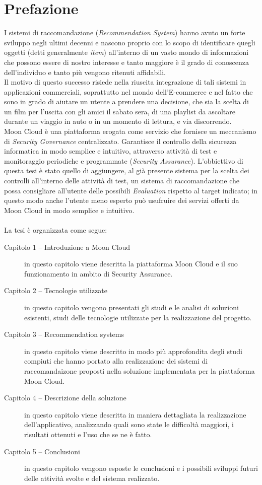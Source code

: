 \chapter{Prefazione}
\label{chp:00-prefaction}

I sistemi di raccomandazione (\textit{Recommendation System}) hanno avuto un forte sviluppo negli ultimi decenni e 
nascono proprio con lo scopo di identificare quegli oggetti (detti generalmente \textit{item}) all'interno di un vasto 
mondo di informazioni che possono essere di nostro interesse e tanto maggiore è il grado di conoscenza dell'individuo 
e tanto più vengono ritenuti affidabili.
\\
Il motivo di questo successo risiede nella riuscita integrazione di tali sistemi in applicazioni commerciali, 
soprattutto nel mondo dell’E-commerce e nel fatto che sono in grado di aiutare un utente a prendere una decisione, che sia la scelta di 
un film per l'uscita con gli amici il sabato sera, di una playlist da ascoltare durante un viaggio in auto o in un momento di lettura, 
e via discorrendo. 
\\
Moon Cloud è una piattaforma erogata come servizio che fornisce un meccanismo di \textit{Security Governance} centralizzato. 
Garantisce il controllo della sicurezza informatica in modo semplice e intuitivo, attraverso attività di test e monitoraggio 
periodiche e programmate (\textit{Security Assurance}). L'obbiettivo di questa tesi è stato quello di aggiungere, al già 
presente sistema per la scelta dei controlli all'interno delle attività di test, un sistema di raccomandazione che possa 
consigliare all'utente delle possibili \textit{Evaluation} rispetto al target indicato; in questo modo anche l'utente meno esperto può 
usufruire dei servizi offerti da Moon Cloud in modo semplice e intuitivo.  
\\
\\
La tesi è organizzata come segue:
\begin{description}
    \item[Capitolo 1 -- Introduzione a Moon Cloud] in questo capitolo viene descritta la piattaforma Moon Cloud e il suo funzionamento
    in ambito di Security Assurance. 
    \item[Capitolo 2 -- Tecnologie utilizzate] in questo capitolo vengono presentati gli studi e le analisi di soluzioni esistenti, 
    studi delle tecnologie utilizzate per la realizzazione del progetto.
    \item[Capitolo 3 -- Recommendation systems] in questo capitolo viene descritto in modo più approfondita degli studi compiuti che 
    hanno portato alla realizzazione dei sistemi di raccomandaizone proposti nella soluzione implementata per la piattaforma Moon Cloud. 
    \item[Capitolo 4 -- Descrizione della soluzione] in questo capitolo viene descritta in maniera dettagliata la realizzazione 
    dell'applicativo, analizzando quali sono state le difficoltà maggiori, i risultati ottenuti e l'uso che se ne è fatto. 
    \item[Capitolo 5 -- Conclusioni] in questo capitolo vengono esposte le conclusioni e i possibili sviluppi futuri delle attività
    svolte e del sistema realizzato.
\end{description}




